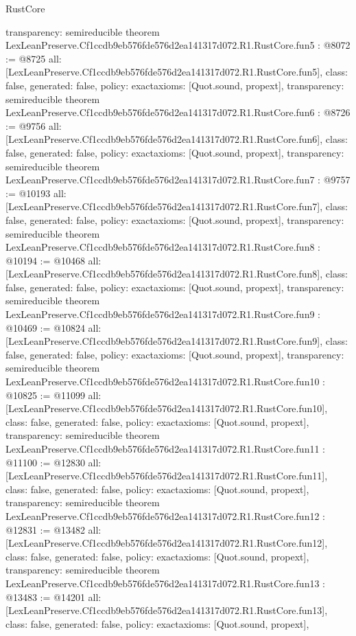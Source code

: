 \begin{lexlean}{RustCore}
\begin{coremodule}
{  transparency: semireducible
}
theorem LexLeanPreserve.Cf1ccdb9eb576fde576d2ea141317d072.R1.RustCore.fun5 : @8072 := @8725 {
  all: [LexLeanPreserve.Cf1ccdb9eb576fde576d2ea141317d072.R1.RustCore.fun5],
  class: false,
  generated: false,
  policy: exact{axioms: [Quot.sound, propext]},
  transparency: semireducible
}
theorem LexLeanPreserve.Cf1ccdb9eb576fde576d2ea141317d072.R1.RustCore.fun6 : @8726 := @9756 {
  all: [LexLeanPreserve.Cf1ccdb9eb576fde576d2ea141317d072.R1.RustCore.fun6],
  class: false,
  generated: false,
  policy: exact{axioms: [Quot.sound, propext]},
  transparency: semireducible
}
theorem LexLeanPreserve.Cf1ccdb9eb576fde576d2ea141317d072.R1.RustCore.fun7 : @9757 := @10193 {
  all: [LexLeanPreserve.Cf1ccdb9eb576fde576d2ea141317d072.R1.RustCore.fun7],
  class: false,
  generated: false,
  policy: exact{axioms: [Quot.sound, propext]},
  transparency: semireducible
}
theorem LexLeanPreserve.Cf1ccdb9eb576fde576d2ea141317d072.R1.RustCore.fun8 : @10194 := @10468 {
  all: [LexLeanPreserve.Cf1ccdb9eb576fde576d2ea141317d072.R1.RustCore.fun8],
  class: false,
  generated: false,
  policy: exact{axioms: [Quot.sound, propext]},
  transparency: semireducible
}
theorem LexLeanPreserve.Cf1ccdb9eb576fde576d2ea141317d072.R1.RustCore.fun9 : @10469 := @10824 {
  all: [LexLeanPreserve.Cf1ccdb9eb576fde576d2ea141317d072.R1.RustCore.fun9],
  class: false,
  generated: false,
  policy: exact{axioms: [Quot.sound, propext]},
  transparency: semireducible
}
theorem LexLeanPreserve.Cf1ccdb9eb576fde576d2ea141317d072.R1.RustCore.fun10 : @10825 := @11099 {
  all: [LexLeanPreserve.Cf1ccdb9eb576fde576d2ea141317d072.R1.RustCore.fun10],
  class: false,
  generated: false,
  policy: exact{axioms: [Quot.sound, propext]},
  transparency: semireducible
}
theorem LexLeanPreserve.Cf1ccdb9eb576fde576d2ea141317d072.R1.RustCore.fun11 : @11100 := @12830 {
  all: [LexLeanPreserve.Cf1ccdb9eb576fde576d2ea141317d072.R1.RustCore.fun11],
  class: false,
  generated: false,
  policy: exact{axioms: [Quot.sound, propext]},
  transparency: semireducible
}
theorem LexLeanPreserve.Cf1ccdb9eb576fde576d2ea141317d072.R1.RustCore.fun12 : @12831 := @13482 {
  all: [LexLeanPreserve.Cf1ccdb9eb576fde576d2ea141317d072.R1.RustCore.fun12],
  class: false,
  generated: false,
  policy: exact{axioms: [Quot.sound, propext]},
  transparency: semireducible
}
theorem LexLeanPreserve.Cf1ccdb9eb576fde576d2ea141317d072.R1.RustCore.fun13 : @13483 := @14201 {
  all: [LexLeanPreserve.Cf1ccdb9eb576fde576d2ea141317d072.R1.RustCore.fun13],
  class: false,
  generated: false,
  policy: exact{axioms: [Quot.sound, propext]},
}
\end{coremodule}
\end{lexlean}
